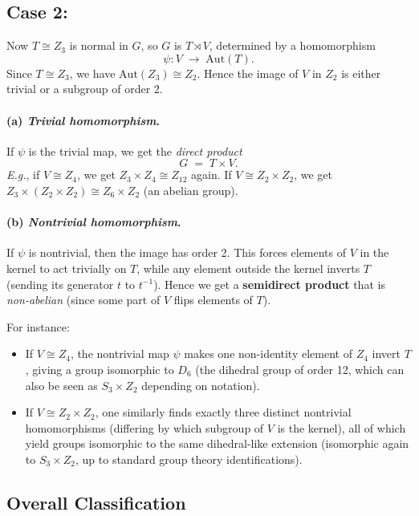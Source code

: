 \documentclass[12pt]{article}
\theoremstyle{definition} %
\theoremstyle{plain} %
\begin{document}
\subsection*{Case 2: }

Now $T \cong Z_3$ is normal in $G$, so $G$ is $T \rtimes V$, determined by a homomorphism
\[
  \psi: V \;\longrightarrow\; \mathrm{Aut}(T).
\]
Since $T \cong Z_3$, we have $\mathrm{Aut}(Z_3) \cong Z_2$.  
Hence the image of $V$ in $Z_2$ is either trivial or a subgroup of order 2. 

\paragraph{(a) \emph{Trivial homomorphism}.}
If $\psi$ is the trivial map, we get the \emph{direct product} 
\[
  G \;=\; T \times V.
\]
\emph{E.g.}, if $V \cong Z_4$, we get $Z_3 \times Z_4 \cong Z_{12}$ again.  
If $V \cong Z_2 \times Z_2$, we get $Z_3 \times (Z_2 \times Z_2) \cong Z_6 \times Z_2$ (an abelian group).

\paragraph{(b) \emph{Nontrivial homomorphism}.}
If $\psi$ is nontrivial, then the image has order 2.  
This forces elements of $V$ in the kernel to act trivially on $T$, while any element outside the kernel inverts $T$ (sending its generator $t$ to $t^{-1}$).  
Hence we get a \textbf{semidirect product} that is \emph{non-abelian} (since some part of $V$ flips elements of $T$).  

\smallskip
\noindent
For instance:
\begin{itemize}
\item If $V \cong Z_4$, the nontrivial map $\psi$ makes one non-identity element of $Z_4$ invert $T$, giving a group isomorphic to $D_{6}$ (the dihedral group of order 12, which can also be seen as $S_3 \times Z_2$ depending on notation).
\item If $V \cong Z_2\times Z_2$, one similarly finds exactly three distinct nontrivial homomorphisms (differing by which subgroup of $V$ is the kernel), all of which yield groups isomorphic to the same dihedral-like extension (isomorphic again to $S_3 \times Z_2$, up to standard group theory identifications).
\end{itemize}

\subsection*{Overall Classification}
\end{document}
